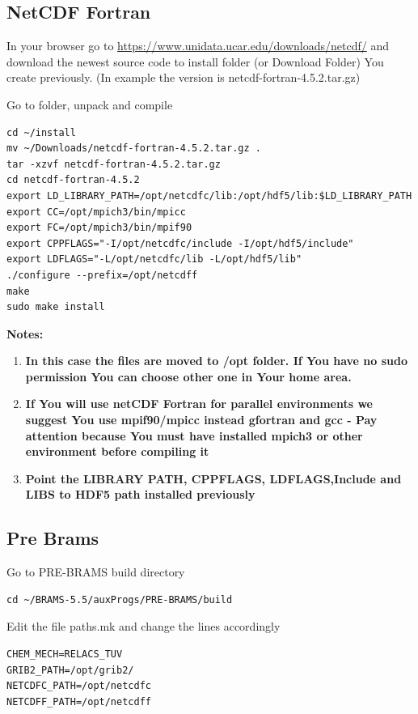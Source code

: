 \documentclass{article}
\begin{document}
\subsection{NetCDF Fortran}

In your browser go to \href{https://www.unidata.ucar.edu/downloads/netcdf/}{https://www.unidata.ucar.edu/downloads/netcdf/} and download the newest source code to install folder (or Download Folder) You create previously. (In example the version is netcdf-fortran-4.5.2.tar.gz)
   
Go to folder, unpack and compile

\begin{verbatim}
cd ~/install
mv ~/Downloads/netcdf-fortran-4.5.2.tar.gz .
tar -xzvf netcdf-fortran-4.5.2.tar.gz
cd netcdf-fortran-4.5.2
export LD_LIBRARY_PATH=/opt/netcdfc/lib:/opt/hdf5/lib:$LD_LIBRARY_PATH
export CC=/opt/mpich3/bin/mpicc
export FC=/opt/mpich3/bin/mpif90
export CPPFLAGS="-I/opt/netcdfc/include -I/opt/hdf5/include"
export LDFLAGS="-L/opt/netcdfc/lib -L/opt/hdf5/lib"
./configure --prefix=/opt/netcdff
make
sudo make install
\end{verbatim}

\textbf{Notes:}
\begin{enumerate}
	\item \textbf{In this case the files are moved to /opt folder. If You have no sudo permission You can choose other one in Your home area.}
	\item \textbf{If You will use netCDF Fortran for parallel environments we suggest You use mpif90/mpicc instead gfortran and gcc - Pay attention because You must have installed mpich3 or other environment before compiling it}
	\item \textbf{Point the LIBRARY PATH, CPPFLAGS, LDFLAGS,Include and LIBS to HDF5 path installed previously }
\end{enumerate}

\subsection{Pre Brams}

Go to PRE-BRAMS build directory 

\begin{verbatim}
cd ~/BRAMS-5.5/auxProgs/PRE-BRAMS/build
\end{verbatim}

Edit the file paths.mk and change the lines accordingly

\begin{verbatim}
CHEM_MECH=RELACS_TUV
GRIB2_PATH=/opt/grib2/
NETCDFC_PATH=/opt/netcdfc
NETCDFF_PATH=/opt/netcdff
\end{verbatim}
\end{document}
